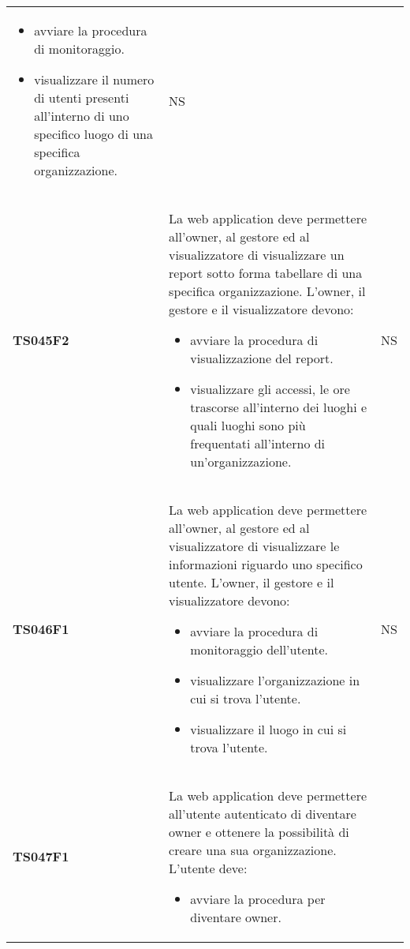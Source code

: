 \documentclass[../piano-di-qualifica.tex]{subfiles}
\begin{document}
\begin{centering}
\begin{longtable}[H]{>{\centering\bfseries}m{3cm} >{}p{10cm} >{\centering\arraybackslash}m{3cm}}
                      \begin{itemize}
                        \item avviare la procedura di monitoraggio.
                        \item visualizzare il numero di utenti presenti all'interno di uno specifico luogo di una specifica organizzazione.
                      \end{itemize}
                    & NS \\
        TS045F2     & La web application deve permettere all'owner, al gestore ed al visualizzatore di visualizzare un report sotto forma tabellare di una specifica organizzazione. \newline
                      L'owner, il gestore e il visualizzatore devono:
                      \begin{itemize}
                        \item avviare la procedura di visualizzazione del report.
                        \item visualizzare gli accessi, le ore trascorse all'interno dei luoghi e quali luoghi sono più frequentati all'interno di un'organizzazione.
                      \end{itemize}
                    & NS \\
        TS046F1     & La web application deve permettere all'owner, al gestore ed al visualizzatore di visualizzare le informazioni riguardo uno specifico utente. \newline
                      L'owner, il gestore e il visualizzatore devono:
                      \begin{itemize}
                        \item avviare la procedura di monitoraggio dell'utente.
                        \item visualizzare l'organizzazione in cui si trova l'utente.
                        \item visualizzare il luogo in cui si trova l'utente.
                      \end{itemize}
                    & NS \\
        TS047F1     & La web application deve permettere all'utente autenticato di diventare owner e ottenere la possibilità di creare una sua organizzazione. \newline
                      L'utente deve:
                      \begin{itemize}
                        \item avviare la procedura per diventare owner.

\end{itemize}
\end{longtable}
\end{centering}
\end{document}
